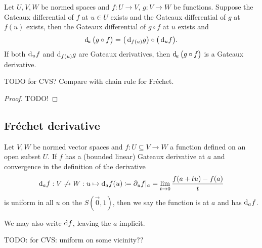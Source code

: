 \begin{proposition}
Let $U,V,W$ be normed spaces and $f: U\to V$, $g: V\to W$ be functions. Suppose the Gateaux differential of $f$ at $u\in U$ exists and the Gateaux differential of $g$ at $f(u)$ exists, then the Gateaux differential of $g\circ f$ at $u$ exists and
\[ \operatorname{d \!}_{u}\big(g\circ f\big) = \big(\operatorname{d \!}{_{f(u)}}g\big) \circ \big(\operatorname{d \!}{_u}f\big). \]
If both $\operatorname{d \!}{_u}f$ and $\operatorname{d \!}{_{f(u)}}g$ are Gateaux derivatives, then $\operatorname{d \!}_{u}\big(g\circ f\big)$ is a Gateaux derivative.
\end{proposition}
TODO for CVS? Compare with chain rule for Fréchet.
\begin{proof}
TODO!
\end{proof}

\subsection{Fréchet derivative}
\begin{definition}
Let $V,W$ be normed vector spaces and $f: U\subseteq V\to W$ a function defined on an open subset $U$.
If $f$ has a (bounded linear) Gateaux derivative at $a$ and convergence in the definition of the derivative
\[ \operatorname{d \!}{_af}: V\not\to W: u\mapsto \operatorname{d \!}{_af}(u) \coloneqq \partial_u f|_a = \lim_{t\to 0} \frac{f(a+tu) - f(a)}{t} \]
is uniform in all $u$ on the $S(\vec{0},1)$, then we say the function is  at $a$ and has  $\operatorname{d \!}{_af}$.

We may also write $\operatorname{d \!}{f}$, leaving the $a$ implicit.
\end{definition}
TODO: for CVS: uniform on some vicinity??


